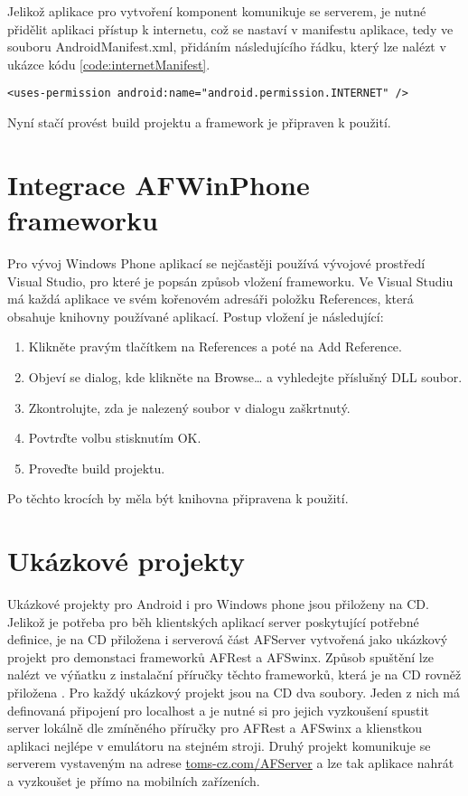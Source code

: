 Jelikož aplikace pro vytvoření komponent komunikuje se serverem, je nutné přidělit aplikaci přístup k internetu, což se nastaví v manifestu aplikace, tedy ve souboru AndroidManifest.xml, přidáním následujícího řádku, který lze nalézt v ukázce kódu \ref{code:internetManifest}.
\begin{lstlisting}[caption={Android manifest - udělení přístupu k internetu},
label={code:internetManifest}, basicstyle=\footnotesize, frame=single]
<uses-permission android:name="android.permission.INTERNET" /> 
\end{lstlisting}

Nyní stačí provést build projektu a framework je připraven k použití.

\section{Integrace AFWinPhone frameworku}
Pro vývoj Windows Phone aplikací se nejčastěji používá vývojové prostředí Visual Studio, pro které je popsán způsob vložení frameworku. Ve Visual Studiu má každá aplikace ve svém kořenovém adresáři položku References, která obsahuje knihovny používané aplikací. Postup vložení je následující:
\begin{enumerate}
\item Klikněte pravým tlačítkem na References a poté na Add Reference.
\item Objeví se dialog, kde klikněte na Browse… a vyhledejte příslušný DLL soubor.
\item Zkontrolujte, zda je nalezený soubor v dialogu zaškrtnutý.
\item Povtrďte volbu stisknutím OK.
\item Proveďte build projektu. 
\end{enumerate}
Po těchto krocích by měla být knihovna připravena k použití.

\section{Ukázkové projekty}
Ukázkové projekty pro Android i pro Windows phone jsou přiloženy na CD. Jelikož je potřeba pro běh klientských aplikací server poskytující potřebné definice, je na CD přiložena i serverová část AFServer vytvořená jako ukázkový projekt pro demonstaci frameworků AFRest a AFSwinx. Způsob spuštění lze nalézt ve výňatku z instalační příručky těchto frameworků, která je na CD rovněž přiložena \cite{tomasek-thesis}. Pro každý ukázkový projekt jsou na CD dva soubory. Jeden z nich má definovaná připojení pro localhost a je nutné si pro jejich vyzkoušení spustit server lokálně dle zmíněného příručky pro AFRest a AFSwinx a klienstkou aplikaci nejlépe v emulátoru na stejném stroji. Druhý projekt komunikuje se serverem vystaveným na adrese \url{toms-cz.com/AFServer} a lze tak aplikace nahrát a vyzkoušet je přímo na mobilních zařízeních. 
